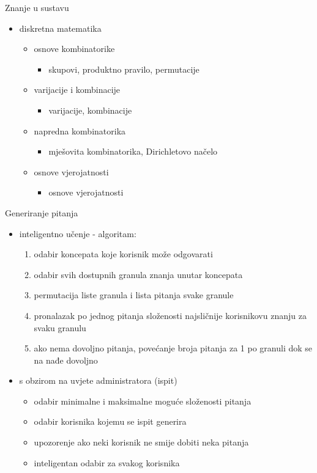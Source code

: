 \documentclass[times, utf8, numeric]{beamer}
\begin{document}
\begin{frame}{Znanje u sustavu}

\begin{itemize}
	\item diskretna matematika
	\begin{itemize}
		\item osnove kombinatorike
		\begin{itemize}
			\item skupovi, produktno pravilo, permutacije
		\end{itemize}
		\item varijacije i kombinacije
		\begin{itemize}
			\item varijacije, kombinacije
		\end{itemize}
	\item napredna kombinatorika
	\begin{itemize}
		\item mješovita kombinatorika, Dirichletovo načelo
	\end{itemize}
	\item osnove vjerojatnosti
	\begin{itemize}
		\item osnove vjerojatnosti
	\end{itemize}
\end{itemize}
	\end{itemize}
\end{frame}

\begin{frame}{Generiranje pitanja}
\begin{itemize}
	\item inteligentno učenje - algoritam:
	\begin{enumerate}
		\item odabir koncepata koje korisnik može odgovarati
		\item odabir svih dostupnih granula znanja unutar koncepata
		\item permutacija liste granula i lista pitanja svake granule
		\item pronalazak po jednog pitanja složenosti najsličnije korisnikovu znanju za svaku granulu
		\item ako nema dovoljno pitanja, povećanje broja pitanja za 1 po granuli dok se na nađe dovoljno
	\end{enumerate}
	\item s obzirom na uvjete administratora (ispit)
	\begin{itemize}
		\item odabir minimalne i maksimalne moguće složenosti pitanja
		\item odabir korisnika kojemu se ispit generira
		\item upozorenje ako neki korisnik ne smije dobiti neka pitanja
		\item inteligentan odabir za svakog korisnika
	\end{itemize}
\end{itemize}
\end{frame}
\end{document}
